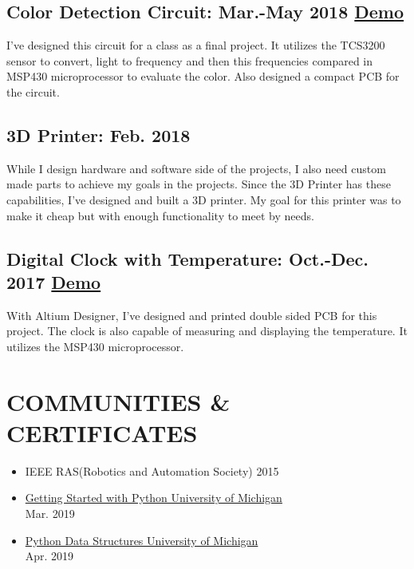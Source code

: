 \documentclass[8pt,twocolumn]{article}
\begin{document}
\subsection{Color Detection Circuit: Mar.-May 2018 \textcolor{Mycolor3}{\href{https://github.com/Zrrck/Color-Detection-using-TCS3200}{}}
\textcolor{Mycolor2}{\href{https://youtu.be/NfwZGEqTPVs}{\small{Demo}}}}
I've designed this circuit for a class as a final project. It utilizes the TCS3200 sensor to convert, light to frequency and then this frequencies compared in MSP430 microprocessor to evaluate the color. Also designed a compact PCB for the circuit.

\subsection{3D Printer: Feb. 2018} 
While I design hardware and software side of the projects, I also need custom made parts to achieve my goals in the projects. Since the 3D Printer has these capabilities, I've designed and built a 3D printer. My goal for this printer was to make it cheap but with enough functionality to meet by needs.

\subsection{Digital Clock with Temperature: Oct.-Dec. 2017 \textcolor{Mycolor3}{\href{https://github.com/Zrrck/Digital-Clock-with-Teperature-Display}{}}
\textcolor{Mycolor2}{\href{https://youtu.be/F9gKzfekm9k}{\small {Demo}}} }
With Altium Designer, I've designed and printed double sided PCB for this project. The clock is also capable of measuring and displaying the temperature. It utilizes the MSP430 microprocessor.




\section{COMMUNITIES \& CERTIFICATES}
\begin{itemize}
\itemsep0em
\item IEEE RAS(Robotics and Automation Society)  2015 


\item \textcolor{Mycolor5}{\href{https://www.coursera.org/account/accomplishments/certificate/8VLTSNMH2832}{Getting Started with Python University of Michigan }}\\
Mar. 2019 

 \item \textcolor{Mycolor5}{\href{https://www.coursera.org/account/accomplishments/certificate/X7QKJD4ASQQD}{Python Data Structures University of Michigan }}\\
 Apr. 2019 
\end{itemize}
\end{document}
